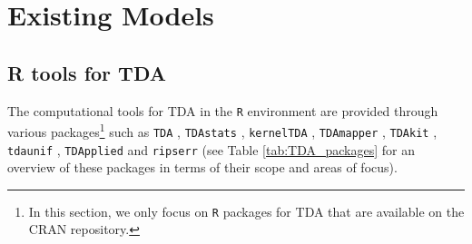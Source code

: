 \documentclass[conference, onecolumn]{IEEEtran}
\begin{document}
\section{Existing Models}

\subsection{R tools for TDA}

The computational tools for TDA in the \texttt{R} environment are provided through various packages\footnote{In this section, we only focus on \texttt{R} packages for TDA that are available on the CRAN repository.} such as \texttt{TDA} \cite{TDA}, \texttt{TDAstats} \cite{wadhwa2018tdastats}, \texttt{kernelTDA} \cite{kernelTDA}, \texttt{TDAmapper} \cite{TDAmapper}, \texttt{TDAkit} \cite{TDAkit}, \texttt{tdaunif} \cite{tdaunif}, \texttt{TDApplied} \cite{TDApplied} and \texttt{ripserr} \cite{ripserr} (see Table \ref{tab:TDA_packages} for an overview of these packages in terms of their scope and areas of focus). 

\newcommand{\cm}{$V$}

\newcommand{\rota}[1]{
  \rotatebox{90}{\texttt{#1}}
}
\end{document}
